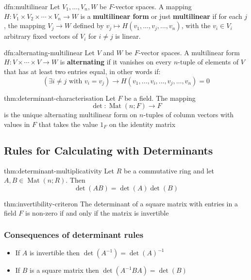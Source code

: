 \documentclass[landscape, 8pt]{extarticle}
\DeclareMathOperator{\Mat}{Mat}
\begin{document}
\begin{multicols}{3}
\begin{dfn}{dfn:multilinear}{}
    Let $V_{1},\dots,V_{n}, W$ be $F$-vector spaces. A mapping $H : V_{1} \times V_{2} \times \cdots \times V_{n} \to W$ is a \textbf{multilinear form} or just \textbf{multilinear} if for each $j$, the mapping $V_{j}\to W$ defined by $v_{j}\mapsto H(v_{1},\dots,v_{j},\dots,v_{n})$, with the $v_{i}\in V_{i}$ arbitrary fixed vectors of $V_{i}$ for $i\ne j$ is linear. 
\end{dfn}

\begin{dfn}{dfn:alternating-multilinear}{}
    Let $V$ and $W$ be $F$-vector spaces. A multilinear form $ H : V \times \cdots \times V \to W$ is \textbf{alternating} if it vanishes on every $n$-tuple of elements of $V$ that has at least two entries equal, in other words if:
    \[(\exists i\ne j \text{ with } v_{i} = v_{j})\to H(v_{1},\dots,v_{i},\dots,v_{j},\dots,v_{n}) = 0\]
\end{dfn}

\begin{thm}{thm:determinant-characterisation}{}
    Let $F$ be a field. The mapping
    \[\det : \Mat(n;F) \to F\]
    is the unique alternating multilinear form on $n$-tuples of column vectors with values in $F$ that takes the value $1_{F}$ on the identity matrix
\end{thm}

\subsection{Rules for Calculating with Determinants}

\begin{thm}{thm:determinant-multiplicativity}{}
    Let $R$ be a commutative ring and let $A,B\in \Mat(n;R)$. Then
    \[\det(AB) = \det(A)\det(B)\]
\end{thm}

\begin{thm}[]{thm:invertibility-criteron}{}
    The determinant of a square matrix with entries in a field $F$ is non-zero if and only if the matrix is invertible
\end{thm}

\newpage
\subsubsection{Consequences of determinant rules}
\begin{itemize}
    \item If $A$ is invertible then $\det(A^{-1}) = \det(A)^{-1}$
    \item If $B$ is a square matrix then $\det(A^{-1}BA) = \det(B)$
\end{itemize}




\end{multicols}
\end{document}
